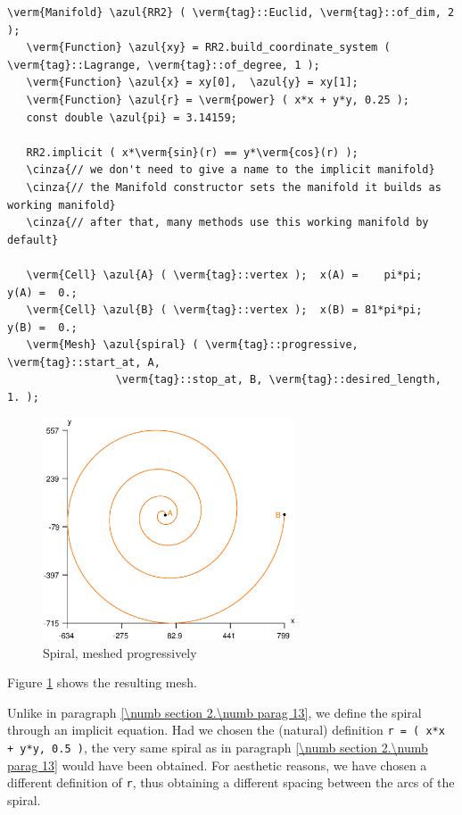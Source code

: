 \begin{Verbatim}[commandchars=\\\{\},formatcom=\small\tt,frame=single,
   label=parag-\ref{\numb section 3.\numb parag 5}.cpp,rulecolor=\color{coment},
   baselinestretch=0.94,framesep=2mm                                            ]
   \verm{Manifold} \azul{RR2} ( \verm{tag}::Euclid, \verm{tag}::of_dim, 2 );
   \verm{Function} \azul{xy} = RR2.build_coordinate_system ( \verm{tag}::Lagrange, \verm{tag}::of_degree, 1 );
   \verm{Function} \azul{x} = xy[0],  \azul{y} = xy[1];
   \verm{Function} \azul{r} = \verm{power} ( x*x + y*y, 0.25 );
   const double \azul{pi} = 3.14159;
   
   RR2.implicit ( x*\verm{sin}(r) == y*\verm{cos}(r) );
   \cinza{// we don't need to give a name to the implicit manifold}
   \cinza{// the Manifold constructor sets the manifold it builds as working manifold}
   \cinza{// after that, many methods use this working manifold by default}
   
   \verm{Cell} \azul{A} ( \verm{tag}::vertex );  x(A) =    pi*pi;   y(A) =  0.;
   \verm{Cell} \azul{B} ( \verm{tag}::vertex );  x(B) = 81*pi*pi;   y(B) =  0.;
   \verm{Mesh} \azul{spiral} ( \verm{tag}::progressive, \verm{tag}::start_at, A,
                 \verm{tag}::stop_at, B, \verm{tag}::desired_length, 1. );
\end{Verbatim}

\begin{figure} \centering
 \includegraphics[width=75mm]{spiral-prog}
  \caption{Spiral, meshed progressively}
 \label{\numb section 3.\numb fig 3}
\end{figure}

Figure \ref{\numb section 3.\numb fig 3} shows the resulting mesh.

Unlike in paragraph \ref{\numb section 2.\numb parag 13}, we define the spiral through
an implicit equation.
Had we chosen the (natural) definition {\small\tt r =  ( x*x + y*y, 0.5 )},
the very same spiral as in paragraph \ref{\numb section 2.\numb parag 13} would have been
obtained.
For aesthetic reasons, we have chosen a different definition of {\small\tt r}, thus obtaining
a different spacing between the arcs of the spiral.

